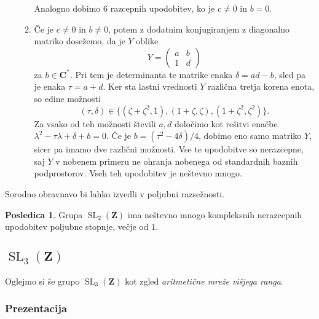 \documentclass[11pt]{book}
\def\ZZ{\mathbf{Z}}
\def\CC{\mathbf{C}}
\DeclareMathOperator\SL{SL}
\theoremstyle{definition}
\theoremstyle{zgled}
\theoremstyle{odprtproblem}
\theoremstyle{domacanaloga}
\theoremstyle{izrek}
\newtheorem*{posledica}{Posledica}
\begin{document}
\begin{enumerate}
\begin{enumerate}
        Analogno dobimo $6$ razcepnih upodobitev, ko je $c \neq 0$ in $b = 0$.

        \item Če je $c \neq 0$ in $b \neq 0$, potem z dodatnim konjugiranjem z diagonalno matriko dosežemo, da je $Y$ oblike
        \[
            Y = \begin{pmatrix}
                a & b \\ 1 & d
            \end{pmatrix}            
        \]
        za $b \in \CC^*$. Pri tem je determinanta te matrike enaka $\delta = ad-b$, sled pa je enaka $\tau = a + d$. Ker sta lastni vrednosti $Y$ različna tretja korena enota, so edine možnosti
        \[
            (\tau, \delta) \in \{ (\zeta + \zeta^2, 1), (1 + \zeta, \zeta), (1 + \zeta^2, \zeta^2) \}.
        \]
        Za vsako od teh možnosti števili $a,d$ določimo kot rešitvi enačbe $\lambda^2 - \tau \lambda + \delta + b = 0$. Če je $b = (\tau^2 - 4 \delta)/4$, dobimo eno samo matriko $Y$, sicer pa imamo dve različni možnosti. Vse te upodobitve so nerazcepne, saj $Y$ v nobenem primeru ne ohranja nobenega od standardnih baznih podprostorov. Vseh teh upodobitev je neštevno mnogo.
    \end{enumerate}
\end{enumerate}

Sorodno obravnavo bi lahko izvedli v poljubni razsežnosti.

\begin{posledica}
Grupa $\SL_2(\ZZ)$ ima neštevno mnogo kompleksnih nerazcepnih upodobitev poljubne stopnje, večje od $1$.
\end{posledica}

\subsection{$\SL_3(\ZZ)$}

Oglejmo si še grupo $\SL_3(\ZZ)$ kot zgled \emph{aritmetične mreže višjega ranga}. 

\subsubsection{Prezentacija}
\end{document}
